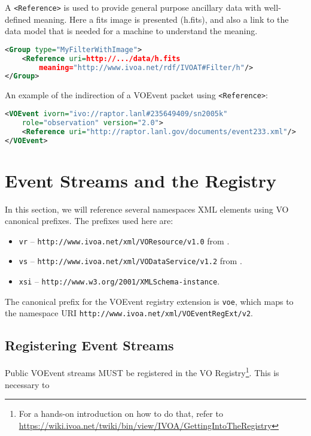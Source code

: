 \documentclass[11pt,a4paper]{ivoa}
\begin{document}
A {\tt <Reference>} is used to provide general purpose ancillary data with
well-defined meaning. Here a fits image is presented (h.fits), and also a link
to the data model that is needed for a machine to understand the meaning.
\begin{lstlisting}[language=XML]
<Group type="MyFilterWithImage">
    <Reference uri=http://.../data/h.fits
        meaning="http://www.ivoa.net/rdf/IVOAT#Filter/h"/>
</Group>
\end{lstlisting}
An example of the indirection of a VOEvent packet using {\tt <Reference>}:
\begin{lstlisting}[language=XML]
<VOEvent ivorn="ivo://raptor.lanl#235649409/sn2005k"
    role="observation" version="2.0">
    <Reference uri="http://raptor.lanl.gov/documents/event233.xml"/>
</VOEvent>
\end{lstlisting}

\section{Event Streams and the Registry}
\label{sec:registry-matters}

In this section, we will reference several namespaces XML elements using
VO canonical prefixes.  The prefixes used here are:

\begin{itemize}
\item \verb|vr| -- \nolinkurl{http://www.ivoa.net/xml/VOResource/v1.0}
from \citet{2018ivoa.spec.0625P}.
\item \verb|vs| --
\nolinkurl{http://www.ivoa.net/xml/VODataService/v1.2}
from \citet{2021ivoa.spec.1102D}.
\item \verb|xsi| --
\nolinkurl{http://www.w3.org/2001/XMLSchema-instance}.
\end{itemize}

The canonical prefix for the VOEvent registry extension is \verb|voe|,
which maps to the namespace URI
\nolinkurl{http://www.ivoa.net/xml/VOEventRegExt/v2}.

\subsection{Registering Event Streams}
\label{sec:registering}

Public VOEvent streams MUST be registered in the VO
Registry\footnote{For a hands-on introduction on how to do that, refer
to
\url{https://wiki.ivoa.net/twiki/bin/view/IVOA/GettingIntoTheRegistry}}.
This is necessary to
\end{document}
